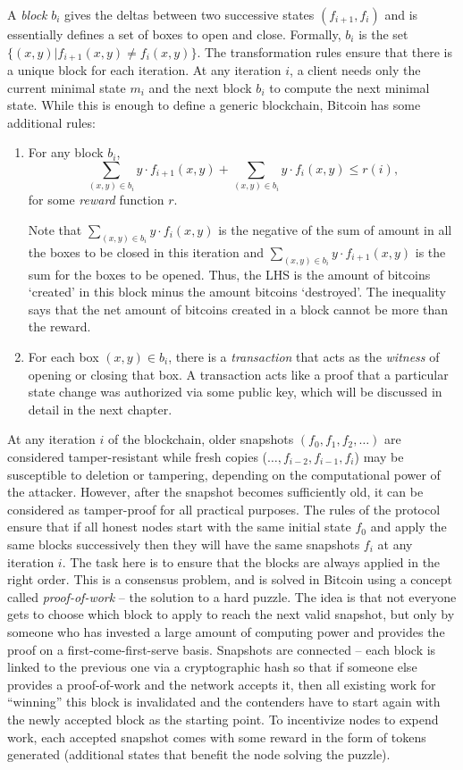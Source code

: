 \documentclass[]{report}   %
\begin{document}
{A {\em block} $b_i$ gives the deltas between two successive states $(f_{i+1}, f_{i})$ and is essentially defines a set of boxes to open and close. Formally, $b_{i}$ is the set $\{(x, y)|f_{i+1}(x, y)\neq f_i(x, y)\}$. The transformation rules ensure that there is a unique block for each iteration. At any iteration $i$, a client needs only the current minimal state $m_i$ and the next block $b_i$ to compute the next minimal state. 
While this is enough to define a generic blockchain, Bitcoin has some additional rules:

\begin{enumerate}
	\item For any block $b_{i}$, $$\sum_{(x, y)\in b_{i}} y\cdot f_{i+1}(x, y) +\sum_{(x, y)\in b_{i}} y\cdot f_{i}(x, y) \leq  r(i),$$ for some {\em reward} function $r$.
	
	Note that $\sum_{(x, y)\in b_{i}} y\cdot f_{i}(x, y)$ is the negative of the sum of amount in all the boxes to be closed in this iteration and $\sum_{(x, y)\in b_{i}} y\cdot f_{i+1}(x, y)$ is the sum for the boxes to be opened. Thus, the LHS is the amount of bitcoins `created' in this block minus the amount bitcoins `destroyed'. The inequality says that the net amount of bitcoins created in a block cannot be more than the reward. 
	\item For each box $(x, y)\in b_i$, there is a {\em transaction} that acts as the {\em witness} of opening or	closing that box. A transaction acts like a proof that a particular state change was authorized via some public key, which will be discussed in detail in the next chapter. 
\end{enumerate}

At any iteration $i$ of the blockchain, older snapshots $(f_0, f_1, f_2, \ldots)$ are considered tamper-resistant while fresh copies ($\ldots, f_{i-2}, f_{i-1}, f_i$) may be susceptible to deletion or tampering, depending on the computational power of the attacker. However, after the snapshot becomes sufficiently old, it can be considered as tamper-proof for all practical purposes. The rules of the protocol ensure that if all honest nodes start with the same initial state $f_0$ and apply the same blocks successively then they will have the same snapshots $f_i$ at any iteration $i$. The task here is to ensure that the blocks are always applied in the right order. This is a consensus problem, and is solved in Bitcoin using a concept called {\em proof-of-work} -- the solution to a hard puzzle. The idea is that not everyone gets to choose which block to apply to reach the next valid snapshot, but only by someone who has invested a large amount of computing power and provides the proof on a first-come-first-serve basis. Snapshots are connected -- each block is linked to the previous one via a cryptographic hash so that if someone else provides a proof-of-work and the network accepts it, then all existing work for ``winning'' this block is invalidated and the contenders have to start again with the newly accepted block as the starting point. To incentivize nodes to expend work, each accepted snapshot comes with some reward in the form of tokens generated (additional states that benefit the node solving the puzzle). 

}
\end{document}
